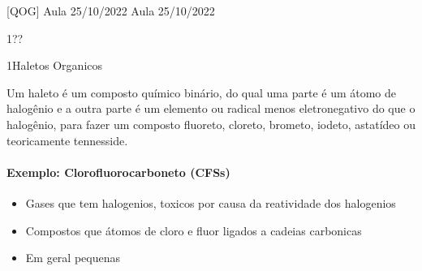 \documentclass[\mainfilename]{subfiles}
\begin{document}
[QOG]
{Aula 25/10/2022} %
{Aula 25/10/2022} %

\begin{sectionBox}1{??} %
    
    \begin{center}
    \end{center}
    
\end{sectionBox}

\begin{sectionBox}1{Haletos Organicos} %
    
    Um haleto é um composto químico binário, do qual uma parte é um átomo de halogênio e a outra parte é um elemento ou radical menos eletronegativo do que o halogênio, para fazer um composto fluoreto, cloreto, brometo, iodeto, astatídeo ou teoricamente tennesside.

    \paragraph*{Exemplo: Clorofluorocarboneto (CFSs)} 
    \begin{itemize}
        \item Gases que tem halogenios, toxicos por causa da reatividade dos halogenios
        \item Compostos que átomos de cloro e fluor ligados a cadeias carbonicas
        \item Em geral pequenas
    \end{itemize}
    
\end{sectionBox}
\end{document}
